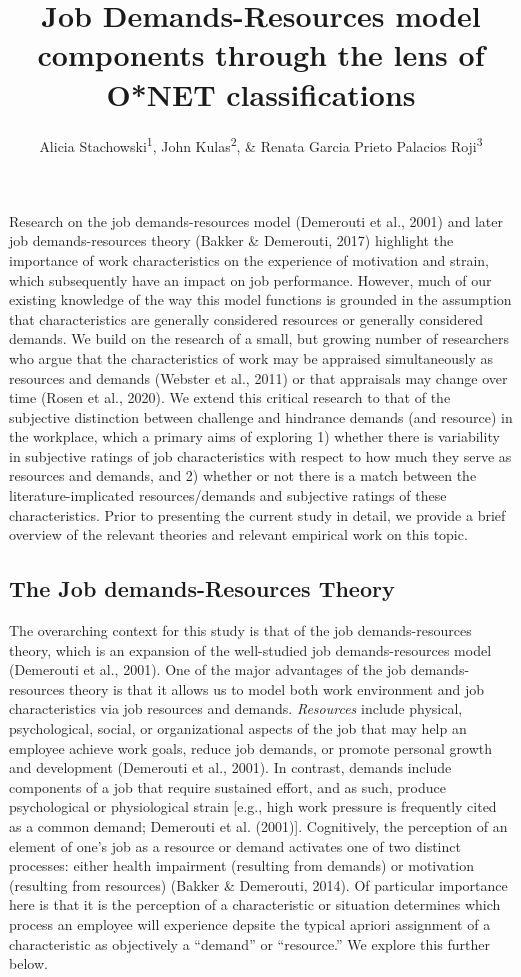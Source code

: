 \documentclass[
  english,
  man]{apa6}
\title{Job Demands-Resources model components through the lens of O*NET classifications}
\author{Alicia Stachowski\textsuperscript{1}, John Kulas\textsuperscript{2}, \& Renata Garcia Prieto Palacios Roji\textsuperscript{3}}
\date{}
\affiliation{\vspace{0.5cm}\textsuperscript{1} University of Wisconsin - Stout\\\textsuperscript{2} eRg\\\textsuperscript{3} PepsiCo}
\begin{document}
\maketitle

Research on the job demands-resources model (Demerouti et al., 2001) and later job demands-resources theory (Bakker \& Demerouti, 2017) highlight the importance of work characteristics on the experience of motivation and strain, which subsequently have an impact on job performance. However, much of our existing knowledge of the way this model functions is grounded in the assumption that characteristics are generally considered resources or generally considered demands. We build on the research of a small, but growing number of researchers who argue that the characteristics of work may be appraised simultaneously as resources and demands (Webster et al., 2011) or that appraisals may change over time (Rosen et al., 2020). We extend this critical research to that of the subjective distinction between challenge and hindrance demands (and resource) in the workplace, which a primary aims of exploring 1) whether there is variability in subjective ratings of job characteristics with respect to how much they serve as resources and demands, and 2) whether or not there is a match between the literature-implicated resources/demands and subjective ratings of these characteristics. Prior to presenting the current study in detail, we provide a brief overview of the relevant theories and relevant empirical work on this topic.

\hypertarget{the-job-demands-resources-theory}{%
\subsection{The Job demands-Resources Theory}\label{the-job-demands-resources-theory}}

The overarching context for this study is that of the job demands-resources theory, which is an expansion of the well-studied job demands-resources model (Demerouti et al., 2001). One of the major advantages of the job demands-resources theory is that it allows us to model both work environment and job characteristics via job resources and demands. \emph{Resources} include physical, psychological, social, or organizational aspects of the job that may help an employee achieve work goals, reduce job demands, or promote personal growth and development (Demerouti et al., 2001). In contrast, demands include components of a job that require sustained effort, and as such, produce psychological or physiological strain {[}e.g., high work pressure is frequently cited as a common demand; Demerouti et al. (2001){]}. Cognitively, the perception of an element of one's job as a resource or demand activates one of two distinct processes: either health impairment (resulting from demands) or motivation (resulting from resources) (Bakker \& Demerouti, 2014). Of particular importance here is that it is the perception of a characteristic or situation determines which process an employee will experience depsite the typical apriori assignment of a characteristic as objectively a ``demand'' or ``resource.'' We explore this further below.
\end{document}
